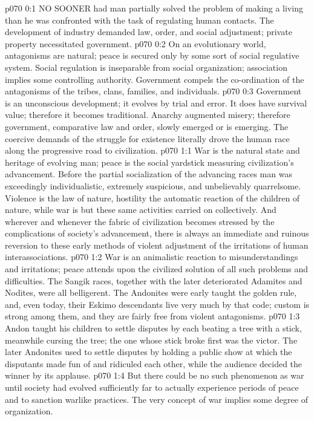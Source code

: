\vs p070 0:1 NO SOONER had man partially solved the problem of making a living than he was confronted with the task of regulating human contacts. The development of industry demanded law, order, and social adjustment; private property necessitated government.
\vs p070 0:2 On an evolutionary world, antagonisms are natural; peace is secured only by some sort of social regulative system. Social regulation is inseparable from social organization; association implies some controlling authority. Government compels the co\hyp{}ordination of the antagonisms of the tribes, clans, families, and individuals.
\vs p070 0:3 Government is an unconscious development; it evolves by trial and error. It does have survival value; therefore it becomes traditional. Anarchy augmented misery; therefore government, comparative law and order, slowly emerged or is emerging. The coercive demands of the struggle for existence literally drove the human race along the progressive road to civilization.
\vs p070 1:1 War is the natural state and heritage of evolving man; peace is the social yardstick measuring civilization’s advancement. Before the partial socialization of the advancing races man was exceedingly individualistic, extremely suspicious, and unbelievably quarrelsome. Violence is the law of nature, hostility the automatic reaction of the children of nature, while war is but these same activities carried on collectively. And wherever and whenever the fabric of civilization becomes stressed by the complications of society’s advancement, there is always an immediate and ruinous reversion to these early methods of violent adjustment of the irritations of human interassociations.
\vs p070 1:2 War is an animalistic reaction to misunderstandings and irritations; peace attends upon the civilized solution of all such problems and difficulties. The Sangik races, together with the later deteriorated Adamites and Nodites, were all belligerent. The Andonites were early taught the golden rule, and, even today, their Eskimo descendants live very much by that code; custom is strong among them, and they are fairly free from violent antagonisms.
\vs p070 1:3 Andon taught his children to settle disputes by each beating a tree with a stick, meanwhile cursing the tree; the one whose stick broke first was the victor. The later Andonites used to settle disputes by holding a public show at which the disputants made fun of and ridiculed each other, while the audience decided the winner by its applause.
\vs p070 1:4 But there could be no such phenomenon as war until society had evolved sufficiently far to actually experience periods of peace and to sanction warlike practices. The very concept of war implies some degree of organization.
